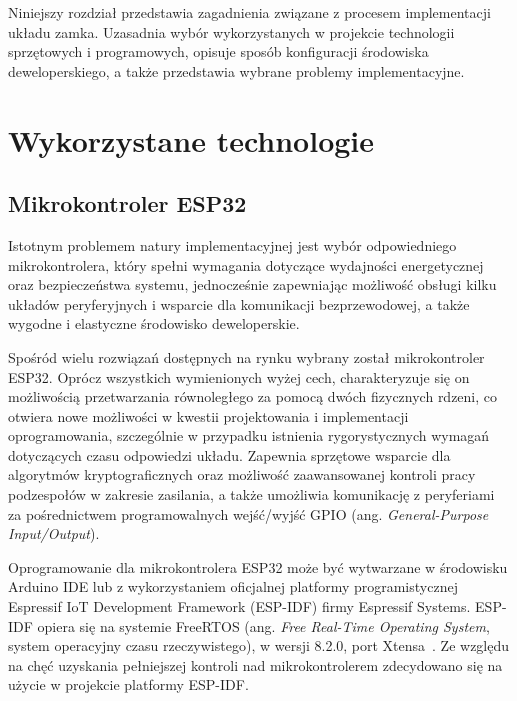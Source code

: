 \label{chap:controller}

    Niniejszy rozdział przedstawia zagadnienia związane z procesem implementacji układu zamka. Uzasadnia wybór wykorzystanych w projekcie technologii sprzętowych i programowych, opisuje sposób konfiguracji środowiska deweloperskiego, a także przedstawia wybrane problemy implementacyjne.

    \section{Wykorzystane technologie}

        \subsection{Mikrokontroler ESP32}

            Istotnym problemem natury implementacyjnej jest wybór odpowiedniego mikrokontrolera, który spełni wymagania dotyczące wydajności energetycznej oraz bezpieczeństwa systemu, jednocześnie zapewniając możliwość obsługi kilku układów peryferyjnych i wsparcie dla komunikacji bezprzewodowej, a także wygodne i elastyczne środowisko deweloperskie.

            Spośród wielu rozwiązań dostępnych na rynku wybrany został mikrokontroler ESP32. Oprócz wszystkich wymienionych wyżej cech, charakteryzuje się on możliwością przetwarzania równoległego za pomocą dwóch fizycznych rdzeni, co otwiera nowe możliwości w kwestii projektowania i implementacji oprogramowania, szczególnie w przypadku istnienia rygorystycznych wymagań dotyczących czasu odpowiedzi układu. Zapewnia sprzętowe wsparcie dla algorytmów kryptograficznych oraz możliwość zaawansowanej kontroli pracy podzespołów w zakresie zasilania, a także umożliwia komunikację z peryferiami za pośrednictwem programowalnych wejść/wyjść GPIO (ang. \textit{General-Purpose Input/Output}).

            Oprogramowanie dla mikrokontrolera ESP32 może być wytwarzane w środowisku Arduino IDE lub z wykorzystaniem oficjalnej platformy programistycznej Espressif IoT Development Framework (ESP-IDF) firmy Espressif Systems. ESP-IDF opiera się na systemie FreeRTOS (ang. \textit{Free Real-Time Operating System}, system operacyjny czasu rzeczywistego), w wersji 8.2.0, port Xtensa~\cite{esp-idf-freertos-smp-changes}. Ze względu na chęć uzyskania pełniejszej kontroli nad mikrokontrolerem zdecydowano się na użycie w projekcie platformy ESP-IDF.

